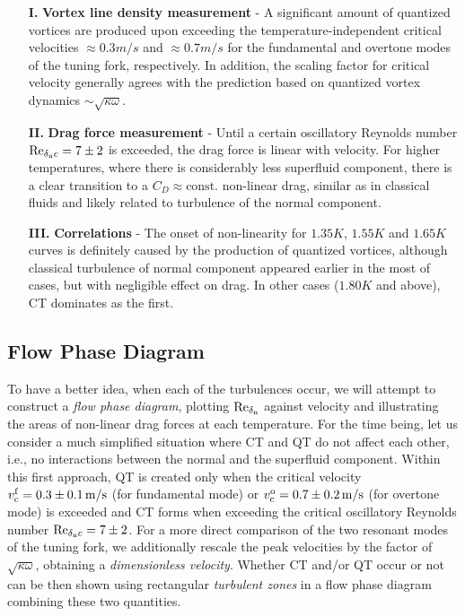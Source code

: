 \begin{itemize}
	\item[\textbf{I.}] \textbf{Vortex line density measurement} - A significant amount of quantized vortices are produced upon exceeding the temperature-independent critical velocities $ \approx 0.3 \unit{m/s} $ and $ \approx 0.7 \unit{m/s} $ for the fundamental and overtone modes of the tuning fork, respectively. In addition, the scaling factor for critical velocity generally agrees with the prediction based on quantized vortex dynamics $ \sim \sqrt{\kappa \omega} $.

	\item[\textbf{II.}] \textbf{Drag force measurement} - Until a certain oscillatory Reynolds number $ \text{Re}_{\delta_{\mathrm{n}}c}=7\pm 2 $ is exceeded, the drag force is linear with velocity. For higher temperatures, where there is considerably less superfluid component, there is a clear transition to a $ C_D \approx \text{const.} $ non-linear drag, similar as in classical fluids and likely related to turbulence of the normal component.

	\item[\textbf{III.}] \textbf{Correlations} - The onset of non-linearity for $ 1.35\unit{K} $, $ 1.55\unit{K} $ and $ 1.65\unit{K} $ curves is definitely caused by the production of quantized vortices, although classical turbulence of normal component appeared earlier in the most of cases, but with negligible effect on drag. In other cases ($ 1.80 \unit{K}$ and above), CT dominates as the first.
\end{itemize}


\subsection*{Flow Phase Diagram}

To have a better idea, when each of the turbulences occur, we will attempt to construct a \textit{flow phase diagram}, plotting $ \text{Re}_{\delta_{\mathrm{n}}} $ against velocity and illustrating the areas of non-linear drag forces at each temperature. For the time being, let us consider a much simplified situation where CT and QT do not affect each other, i.e., no interactions between the normal and the superfluid component. Within this first approach, QT is created only  when the critical velocity $ v_{\mathrm{c}}^{\mathrm{{f}}} = 0.3 \pm 0.1 \,\mathrm{m/s}$ (for fundamental mode) or $ v_{\mathrm{c}}^{\mathrm{{o}}} = 0.7 \pm 0.2 \,\mathrm{m/s}$ (for overtone mode) is exceeded and CT forms when exceeding the critical oscillatory Reynolds number $ \text{Re}_{\delta_{\mathrm{n}}c}=7\pm 2 $. For a more direct comparison of the two resonant modes of the tuning fork, we additionally rescale the peak velocities by the factor of $\sqrt{\kappa \omega}$, obtaining a \textit{dimensionless velocity}. Whether CT and/or QT occur or not can be then shown using rectangular \textit{turbulent zones} in a flow phase diagram combining these two quantities.

